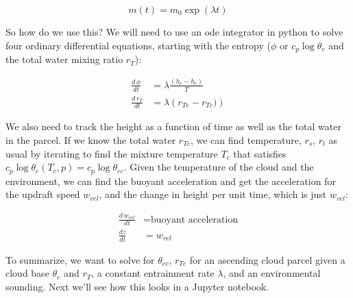\documentclass[12pt]{article}
\begin{document}
\begin{equation}
  \label{eq:sol}
  m(t) = m_0 \exp ( \lambda  t)
\end{equation}

So how do we use this?  We will need to use an ode integrator in python
to solve four ordinary differential equations, starting with the entropy ($\phi$ or $c_p \log \theta_e$ and the total water mixing ratio $r_T$):


\begin{align}
  \label{eq:odeent}
     \frac{d\,\phi}{dt} &= \lambda \frac{ (h_e - h_c)}{T} \\
     \frac{d\,r_T}{dt} &= \lambda \left (r_{Te} - r_{Tc}) \right )
\end{align}

We also need to track the height as a function of time as well as the total water in
the parcel.
If we know the total water $r_{Tc}$, we can find temperature, $r_s$,
$r_l$ as usual by iterating to find the mixture temperature $T_c$
that satisfies $c_p \log \theta_{e}(T_c, p) = c_p \log \theta_{ec} $.  Given the temperature
of the cloud and the environment, we can find the buoyant acceleration and get
the acceleration for the  updraft speed $w_{vel}$, and the change in height per unit time, which is just $w_{vel}$:

  \begin{align}
    \frac{ d\,w_{vel}}{dt} & = \text{buoyant acceleration} \\
    \frac{dz}{dt} & = w_{vel}
  \end{align}

To summarize,  we want to solve for $\theta_{ec}$, $r_{Tc}$ for an ascending cloud parcel given
a cloud base $\theta_e$ and $r_T$, a constant entrainment rate $\lambda$, and an environmental
sounding.  Next we'll see how this looks in a Jupyter notebook.
\end{document}
